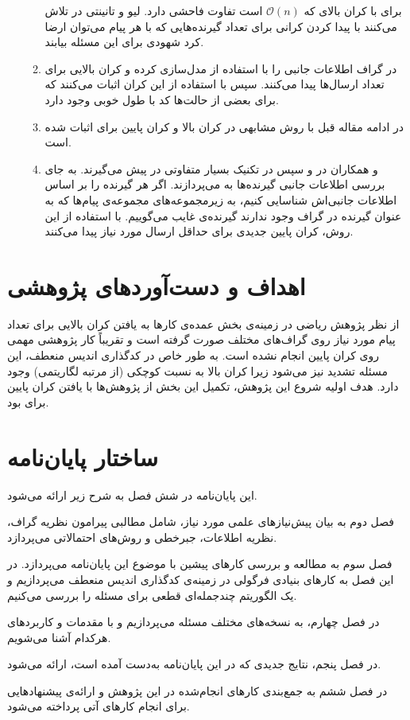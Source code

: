 \begin{enumerate}
\begin{enumerate}
 		برای
 		\picod
 		با کران بالای
 		\icod
 		که
 		$\mathcal{O}(n)$
 		است تفاوت فاحشی دارد. لیو و تانینتی در
 		\cite{7606849}
 		تلاش می‌کنند با پیدا کردن کرانی برای تعداد گیرنده‌هایی که با هر پیام می‌توان ارضا کرد شهودی برای این مسئله بیابند.
 		\item 
 		در
 		\cite{9518120}
 		گراف اطلاعات جانبی را با استفاده از 
 		مدل‌سازی کرده و کران بالایی برای تعداد ارسال‌ها پیدا می‌کنند. سپس با استفاده از این کران اثبات می‌کنند که برای بعضی از حالت‌ها کد با طول خوبی وجود دارد.
 		\item
 		در ادامه مقاله قبل با روش مشابهی در
 		\cite{9965883}
 		کران بالا و کران پایین برای
 		\picod
 		اثبات شده است.
 		\item
 		و همکاران در
 		\cite{ong2019improved}
 		و سپس در
 		\cite{8849527}
 		تکنیک بسیار متفاوتی در پیش می‌گیرند. به جای بررسی اطلاعات جانبی گیرنده‌ها به 
 		می‌پردازند. اگر هر گیرنده را بر اساس اطلاعات جانبی‌اش شناسایی کنیم، به زیرمجموعه‌های مجموعه‌ی پیام‌ها که به عنوان گیرنده در گراف وجود ندارند گیرنده‌ی غایب می‌گوییم. با استفاده از این روش، کران پایین جدیدی برای حداقل ارسال مورد نیاز پیدا می‌کنند.
 	\end{enumerate}
 \end{enumerate}
 
\pagebreak 
\section{اهداف و دست‌آورد‌های پژوهشی}
از نظر پژوهش ریاضی در زمینه‌ی \picod بخش عمده‌ی کارها به یافتن کران بالایی برای تعداد پیام مورد نیاز روی گراف‌های مختلف صورت گرفته است و تقریباً کار پژوهشی‌ مهمی روی کران پایین انجام نشده است. به طور خاص در کدگذاری اندیس منعطف، این مسئله تشدید نیز می‌شود زیرا کران بالا به نسبت کوچکی (از مرتبه لگاریتمی) وجود دارد. هدف اولیه شروع این پژوهش‌، تکمیل این بخش از پژوهش‌ها با یافتن کران پایین برای \picod بود.
\section{ساختار پایان‌نامه}

این پایان‌نامه در شش فصل به شرح زیر ارائه می‌شود.

فصل دوم به بیان پیش‌نیازهای علمی مورد نیاز، شامل مطالبی پیرامون نظریه گراف، نظریه اطلاعات، جبرخطی و روش‌های احتمالاتی می‌پردازد.

فصل سوم به مطالعه و بررسی کارهای پیشین با موضوع این پایان‌نامه می‌پردازد. در این فصل به کارهای بنیادی فرگولی در زمینه‌ی کدگذاری اندیس منعطف می‌پردازیم و یک الگوریتم چندجمله‌ای قطعی برای مسئله را بررسی می‌کنیم.

در فصل چهارم، به نسخه‌های مختلف مسئله می‌پردازیم و با مقدمات و کاربردهای هرکدام آشنا می‌شویم.

در فصل پنجم، نتایج جدیدی که در این پایان‌نامه به‌دست آمده است، ارائه می‌شود.

در فصل ششم به جمع‌بندی کارهای انجام‌شده در این پژوهش و ارائه‌ی پیشنهادهایی برای انجام کارهای آتی پرداخته می‌شود.